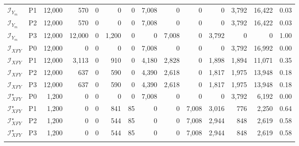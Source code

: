 \begin{table}[!tbp]
\begin{tabular}{@{}llrrrrrrrrrrrr@{}}
$\mathcal I_{Y_m}$ & P1 & 12,000 & 570 & 0 & 0 & 0 & 7,008 & 0 & 0 & 0 & 3,792 & 16,422 & 0.03 \\
$\mathcal I_{Y_m}$ & P2 & 12,000 & 570 & 0 & 0 & 0 & 7,008 & 0 & 0 & 0 & 3,792 & 16,422 & 0.03 \\
$\mathcal I_{Y_m}$ & P3 & 12,000 & 12,000 & 0 & 1,200 & 0 & 0 & 7,008 & 0 & 3,792 & 0 & 0 & 1.00 \\
\addlinespace[1pt]
$\mathcal I_{XFY}$ & P0 & 12,000 & 0 & 0 & 0 & 0 & 7,008 & 0 & 0 & 0 & 3,792 & 16,992 & 0.00 \\
$\mathcal I_{XFY}$ & P1 & 12,000 & 3,113 & 0 & 910 & 0 & 4,180 & 2,828 & 0 & 1,898 & 1,894 & 11,071 & 0.35 \\
$\mathcal I_{XFY}$ & P2 & 12,000 & 637 & 0 & 590 & 0 & 4,390 & 2,618 & 0 & 1,817 & 1,975 & 13,948 & 0.18 \\
$\mathcal I_{XFY}$ & P3 & 12,000 & 637 & 0 & 590 & 0 & 4,390 & 2,618 & 0 & 1,817 & 1,975 & 13,948 & 0.18 \\
\addlinespace[1pt]
$\mathcal I_{XFY}^{\star}$ & P0 & 1,200 & 0 & 0 & 0 & 0 & 7,008 & 0 & 0 & 0 & 3,792 & 6,192 & 0.00 \\
$\mathcal I_{XFY}^{\star}$ & P1 & 1,200 & 0 & 0 & 841 & 85 & 0 & 0 & 7,008 & 3,016 & 776 & 2,250 & 0.64 \\
$\mathcal I_{XFY}^{\star}$ & P2 & 1,200 & 0 & 0 & 544 & 85 & 0 & 0 & 7,008 & 2,944 & 848 & 2,619 & 0.58 \\
$\mathcal I_{XFY}^{\star}$ & P3 & 1,200 & 0 & 0 & 544 & 85 & 0 & 0 & 7,008 & 2,944 & 848 & 2,619 & 0.58 \\
\addlinespace[1pt]
\bottomrule
\end{tabular}
\end{table}

